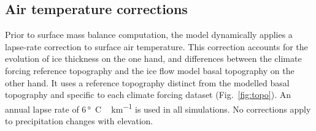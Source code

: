
\subsection{Air temperature corrections}

Prior to surface mass balance computation, the model dynamically applies a lapse-rate correction to surface air temperature. This correction accounts for the evolution of ice thickness on the one hand, and differences between the climate forcing reference topography and the ice flow model basal topography on the other hand. It uses a reference topography distinct from the modelled basal topography and specific to each climate forcing dataset (Fig.~\ref{fig:topo}). An annual lapse rate of 6\,\unit{\degree C\,km^{-1}} is used in all simulations. No corrections apply to precipitation changes with elevation.
